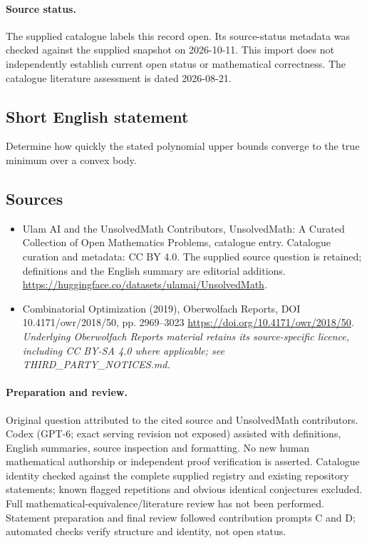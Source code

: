 \documentclass[11pt]{article}
\begin{document}
\paragraph{Source status.}
The supplied catalogue labels this record open. Its source-status metadata was checked against the supplied snapshot on 2026-10-11. This import does not independently establish current open status or mathematical correctness. The catalogue literature assessment is dated 2026-08-21.
\subsection{Short English statement}
Determine how quickly the stated polynomial upper bounds converge to the true minimum over a convex body.
\subsection{Sources}
\begin{itemize}
\item[S1] Ulam AI and the UnsolvedMath Contributors, UnsolvedMath: A Curated Collection of Open Mathematics Problems, catalogue entry. Catalogue curation and metadata: CC BY 4.0. The supplied source question is retained; definitions and the English summary are editorial additions.
\url{https://huggingface.co/datasets/ulamai/UnsolvedMath}.
\item[S2] Combinatorial Optimization (2019), Oberwolfach Reports, DOI 10.4171/owr/2018/50, pp. 2969--3023
\url{https://doi.org/10.4171/owr/2018/50}.
\textit{Underlying Oberwolfach Reports material retains its source-specific licence, including CC BY-SA 4.0 where applicable; see THIRD\_PARTY\_NOTICES.md.}
\end{itemize}
\paragraph{Preparation and review.}
Original question attributed to the cited source and UnsolvedMath contributors. Codex (GPT-6; exact serving revision not exposed) assisted with definitions, English summaries, source inspection and formatting. No new human mathematical authorship or independent proof verification is asserted. Catalogue identity checked against the complete supplied registry and existing repository statements; known flagged repetitions and obvious identical conjectures excluded. Full mathematical-equivalence/literature review has not been performed. Statement preparation and final review followed contribution prompts C and D; automated checks verify structure and identity, not open status.
\label{end:statement}
\end{document}
